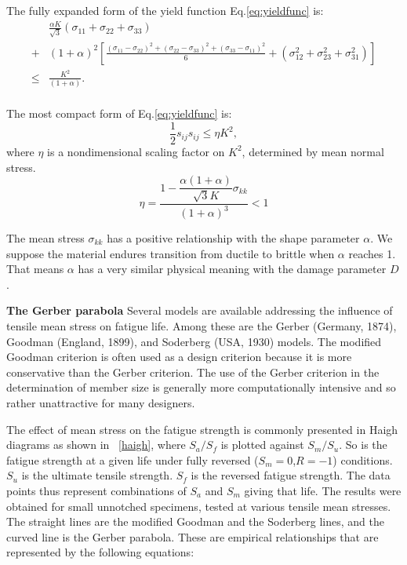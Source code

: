 \documentclass[3p,times,procedia,number]{elsarticle}
\newcommand{\figref}[1]{\figurename~\ref{#1}}
\begin{document}
The fully expanded form of the yield function Eq.\eqref{eq:yieldfunc} is:
\begin{equation}
	\begin{split}
		&\frac{\alpha K}{\sqrt{3}}(\sigma_{11}+\sigma_{22}+\sigma_{33})\\
		+&(1+\alpha)^2\left[\frac{(\sigma_{11}-\sigma_{22})^2+(\sigma_{22}-\sigma_{33})^2+(\sigma_{33}-\sigma_{11})^2}{6}
		+(\sigma_{12}^2+\sigma_{23}^2+\sigma_{31}^2) \right]\\
		\leqslant&\frac{K^2}{(1+\alpha)}.\\
	\end{split}
\end{equation}

The most compact form of Eq.\eqref{eq:yieldfunc} is:
\begin{equation}
	\frac{1}{2}s_{ij}s_{ij}\leqslant\eta K^2,
\end{equation}
where $\eta$ is a nondimensional scaling factor on $K^2$, determined by mean normal stress.
$$\eta=\frac{1-\dfrac{\alpha(1+\alpha)}{\sqrt{3}K}\sigma_{kk}}{(1+\alpha)^3}<1$$


The mean stress $\sigma_{kk}$ has a positive relationship with the shape parameter $\alpha$. We suppose the material endures transition from ductile to brittle when $\alpha$ reaches 1. That means $\alpha$ has a very similar physical meaning with the damage parameter $D$.

\textbf{The Gerber parabola}
Several models are available
addressing the influence of tensile mean stress on fatigue life. Among these are the Gerber (Germany, 1874), Goodman
(England, 1899), and Soderberg (USA, 1930) models.  The modified Goodman criterion is often used as a design criterion
because it is more conservative than the Gerber criterion. The use of the Gerber criterion in the determination of member size is generally more computationally  intensive and so rather unattractive for many designers.

The effect of mean stress on the fatigue strength is commonly presented in Haigh diagrams as shown in \figref{haigh}, where $S_a / S_f$ is plotted against $S_m / S_u$. So is the fatigue strength at a given life under fully reversed ($S_m = 0$,$R = -1$) conditions. $S_u$ is the ultimate tensile strength. $S_f$ is the reversed fatigue strength. The data points thus represent combinations of $S_a$ and $S_m$ giving that life. The results were obtained for small unnotched specimens, tested at various tensile mean stresses. The straight lines are the modified Goodman and the Soderberg lines, and the curved line is the Gerber parabola. These are empirical relationships that are represented by the following equations:
\end{document}
